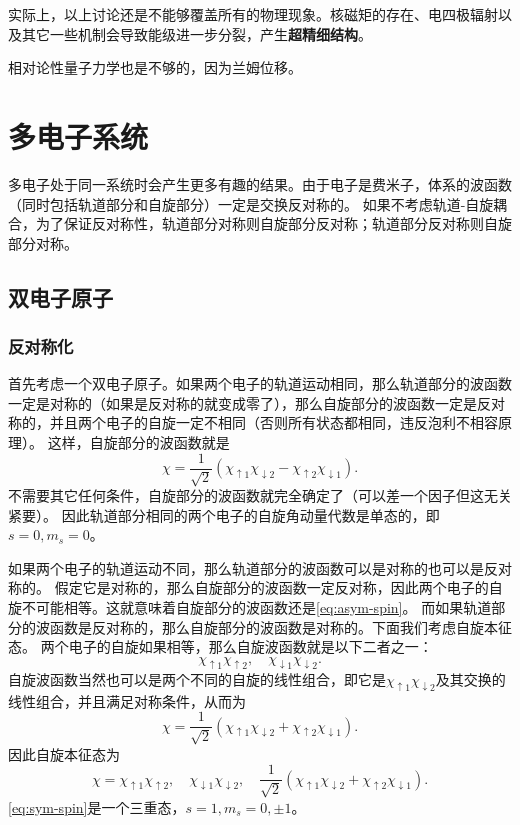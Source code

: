 \documentclass[UTF8, a4paper]{ctexart}
\begin{document}
实际上，以上讨论还是不能够覆盖所有的物理现象。核磁矩的存在、电四极辐射以及其它一些机制会导致能级进一步分裂，产生\textbf{超精细结构}。

相对论性量子力学也是不够的，因为兰姆位移。

\section{多电子系统}

多电子处于同一系统时会产生更多有趣的结果。由于电子是费米子，体系的波函数（同时包括轨道部分和自旋部分）一定是交换反对称的。
如果不考虑轨道-自旋耦合，为了保证反对称性，轨道部分对称则自旋部分反对称；轨道部分反对称则自旋部分对称。

\subsection{双电子原子}

\subsubsection{反对称化}

首先考虑一个双电子原子。如果两个电子的轨道运动相同，那么轨道部分的波函数一定是对称的（如果是反对称的就变成零了），那么自旋部分的波函数一定是反对称的，并且两个电子的自旋一定不相同（否则所有状态都相同，违反泡利不相容原理）。
这样，自旋部分的波函数就是
\begin{equation}
    \chi = \frac{1}{\sqrt{2}} (\chi_{\uparrow 1} \chi_{\downarrow 2} - \chi_{\uparrow 2} \chi_{\downarrow 1}).
    \label{eq:asym-spin}
\end{equation}
不需要其它任何条件，自旋部分的波函数就完全确定了（可以差一个因子但这无关紧要）。
因此轨道部分相同的两个电子的自旋角动量代数是单态的，即$s=0, m_s=0$。

如果两个电子的轨道运动不同，那么轨道部分的波函数可以是对称的也可以是反对称的。
假定它是对称的，那么自旋部分的波函数一定反对称，因此两个电子的自旋不可能相等。这就意味着自旋部分的波函数还是\eqref{eq:asym-spin}。
而如果轨道部分的波函数是反对称的，那么自旋部分的波函数是对称的。下面我们考虑自旋本征态。
两个电子的自旋如果相等，那么自旋波函数就是以下二者之一：
\[
    \chi_{\uparrow 1} \chi_{\uparrow 2}, \quad \chi_{\downarrow 1} \chi_{\downarrow 2}.
\]
自旋波函数当然也可以是两个不同的自旋的线性组合，即它是$\chi_{\uparrow 1} \chi_{\downarrow 2}$及其交换的线性组合，并且满足对称条件，从而为
\[
    \chi = \frac{1}{\sqrt{2}} (\chi_{\uparrow 1} \chi_{\downarrow 2} + \chi_{\uparrow 2} \chi_{\downarrow 1}).
\]
因此自旋本征态为
\begin{equation}
    \chi = \chi_{\uparrow 1} \chi_{\uparrow 2}, \quad \chi_{\downarrow 1} \chi_{\downarrow 2}, \quad \frac{1}{\sqrt{2}} (\chi_{\uparrow 1} \chi_{\downarrow 2} + \chi_{\uparrow 2} \chi_{\downarrow 1}).
    \label{eq:sym-spin}
\end{equation}
\eqref{eq:sym-spin}是一个三重态，$s=1, m_s=0, \pm 1$。
\end{document}
